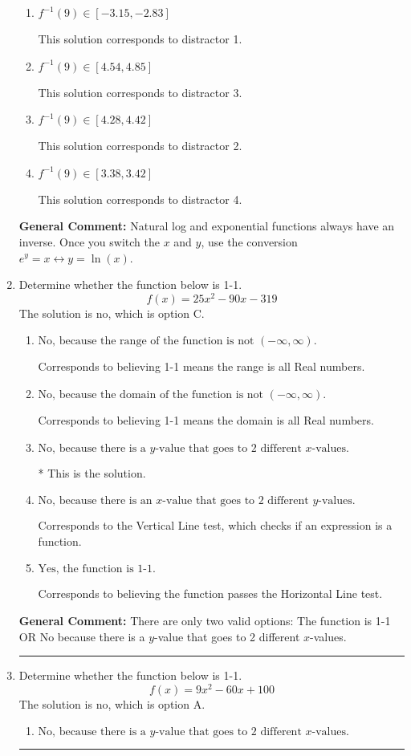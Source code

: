 \documentclass{extbook}[14pt]
\newcommand{\litem}[1]{\item #1

\rule{\textwidth}{0.4pt}}
\begin{document}
\begin{enumerate}
{\begin{enumerate}[label=\Alph*.]
 This is the solution.
\item \( f^{-1}(9) \in [-3.15, -2.83] \)

 This solution corresponds to distractor 1.
\item \( f^{-1}(9) \in [4.54, 4.85] \)

 This solution corresponds to distractor 3.
\item \( f^{-1}(9) \in [4.28, 4.42] \)

 This solution corresponds to distractor 2.
\item \( f^{-1}(9) \in [3.38, 3.42] \)

 This solution corresponds to distractor 4.
\end{enumerate}

\textbf{General Comment:} Natural log and exponential functions always have an inverse. Once you switch the $x$ and $y$, use the conversion $ e^y = x \leftrightarrow y=\ln(x)$.
}
\litem{
Determine whether the function below is 1-1.
\[ f(x) = 25 x^2 - 90 x - 319 \]The solution is \( \text{no} \), which is option C.\begin{enumerate}[label=\Alph*.]
\item \( \text{No, because the range of the function is not $(-\infty, \infty)$.} \)

Corresponds to believing 1-1 means the range is all Real numbers.
\item \( \text{No, because the domain of the function is not $(-\infty, \infty)$.} \)

Corresponds to believing 1-1 means the domain is all Real numbers.
\item \( \text{No, because there is a $y$-value that goes to 2 different $x$-values.} \)

* This is the solution.
\item \( \text{No, because there is an $x$-value that goes to 2 different $y$-values.} \)

Corresponds to the Vertical Line test, which checks if an expression is a function.
\item \( \text{Yes, the function is 1-1.} \)

Corresponds to believing the function passes the Horizontal Line test.
\end{enumerate}

\textbf{General Comment:} There are only two valid options: The function is 1-1 OR No because there is a $y$-value that goes to 2 different $x$-values.
}
\litem{
Determine whether the function below is 1-1.
\[ f(x) = 9 x^2 - 60 x + 100 \]The solution is \( \text{no} \), which is option A.\begin{enumerate}[label=\Alph*.]
\item \( \text{No, because there is a $y$-value that goes to 2 different $x$-values.} \)


\end{enumerate}}
\end{enumerate}
\end{document}
